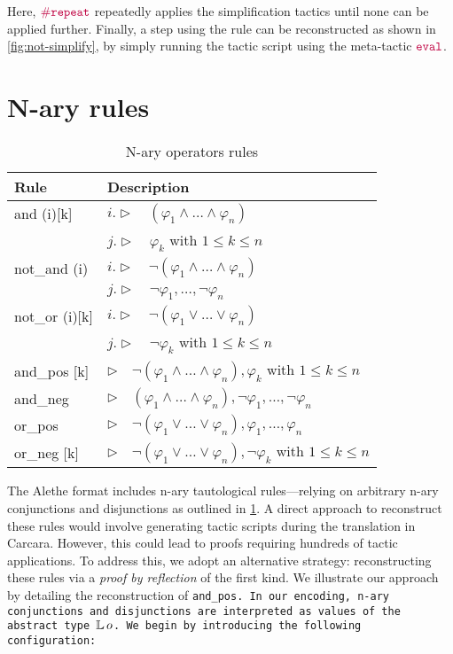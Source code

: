 Here, $\mathop{\mathtt{\textcolor{purple}{\#repeat}}}$ repeatedly applies the simplification tactics until none can be applied further.
Finally, a step using the  rule can be reconstructed as shown in \cref{fig:not-simplify}, by simply running the tactic script using the meta-tactic $\mathop{\mathtt{\textcolor{purple}{eval}}}$.

\section{N-ary rules}

\begin{table}
\centering
\caption{N-ary operators rules}
\begin{tabular}{ll}
Rule & Description \\ \hline
and (i)[k] & $i. \triangleright \quad (\varphi_1 \land \dots \land \varphi_n)$ \\
    & $j. \triangleright \quad \varphi_k $ with $1 \leq k \leq n$\\
not\_and (i) & $i. \triangleright \quad \neg (\varphi_1 \land \dots \land \varphi_n)$ \\
    & $j. \triangleright \quad \neg \varphi_1, \dots, \neg \varphi_n $\\
not\_or (i)[k] & $i. \triangleright \quad \neg (\varphi_1 \lor \dots \lor \varphi_n)$\\
    & $j. \triangleright \quad \neg \varphi_k$ with $1 \leq k \leq n$\\
and\_pos [k] & $\triangleright \quad \neg (\varphi_1 \land \dots \land \varphi_n), \varphi_k$ with $1 \leq k \leq n$ \\
and\_neg & $\triangleright \quad (\varphi_1 \land \dots \land \varphi_n), \neg \varphi_1, \dots, \neg \varphi_n$ \\
or\_pos & $\triangleright \quad \neg (\varphi_1 \lor \dots \lor \varphi_n), \varphi_1, \dots, \varphi_n$ \\
or\_neg [k] & $\triangleright \quad \neg (\varphi_1 \lor \dots \lor \varphi_n), \neg \varphi_k$ with $1 \leq k \leq n$ \\
\end{tabular}
\label{table:nary-rules}
\end{table}

The Alethe format includes n-ary tautological rules—relying on arbitrary n-ary conjunctions and disjunctions as outlined in \cref{table:nary-rules}.
A direct approach to reconstruct these rules would involve generating tactic scripts during the translation in Carcara.
However, this could lead to proofs requiring hundreds of tactic applications.
To address this, we adopt an alternative strategy: reconstructing these rules via a \emph{proof by reflection} of the first kind.
We illustrate our approach by detailing the reconstruction of \tt{and\_pos}.
In our encoding, n-ary conjunctions and disjunctions are interpreted as values of the abstract type $\mathbb{L}\,o$.
We begin by introducing the following configuration:

